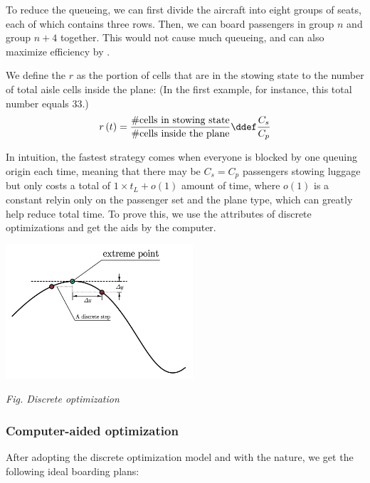 \documentclass{article}
\theoremstyle{definition}
\theoremstyle{remark}
\numberwithin{equation}{section}
\begin{document}
	To reduce the queueing, we can first divide the aircraft into eight groups of seats, each of which contains three rows. Then, we can board passengers in group $n$ and group $n+4$ together. This would not cause much queueing, and can also maximize efficiency by .

	We define the  \(r\) as the portion of cells that are in the stowing state to the number of total aisle cells inside the plane: (In the first example, for instance, this total number equals \(33\).)
	\[r\left(t\right) = \dfrac{\#\text{cells in stowing state}}{\#\text{cells inside the plane}}\ddef\dfrac{C_s}{C_p}\]

	In intuition, the fastest strategy comes when everyone is blocked by one queuing origin each time, meaning that there may be \(C_s=C_p\) passengers stowing luggage but only costs a total of \(1\times t_L+o\left(1\right)\) amount of time, where \(o(1)\) is a constant relyin only on the passenger set and the plane type, which can greatly help reduce total time. To prove this, we use the attributes of discrete optimizations and get the aids by the computer.
	\begin{center}
		\includegraphics[height = 5cm]{discrete optimization.jpg}

		\small\textit{Fig. Discrete optimization}
	\end{center}

	\subsubsection{Computer-aided optimization}
	After adopting the discrete optimization model and with the  nature, we get the following ideal boarding plans:
\end{document}
